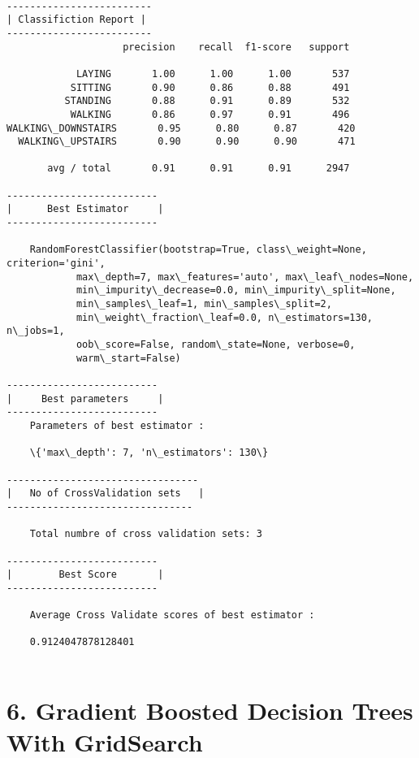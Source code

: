 \documentclass[11pt]{article}
\begin{document}
    \begin{center}
    \end{center}
    { \hspace*{\fill} \\}
    
    \begin{Verbatim}[commandchars=\\\{\}]
-------------------------
| Classifiction Report |
-------------------------
                    precision    recall  f1-score   support

            LAYING       1.00      1.00      1.00       537
           SITTING       0.90      0.86      0.88       491
          STANDING       0.88      0.91      0.89       532
           WALKING       0.86      0.97      0.91       496
WALKING\_DOWNSTAIRS       0.95      0.80      0.87       420
  WALKING\_UPSTAIRS       0.90      0.90      0.90       471

       avg / total       0.91      0.91      0.91      2947

--------------------------
|      Best Estimator     |
--------------------------

	RandomForestClassifier(bootstrap=True, class\_weight=None, criterion='gini',
            max\_depth=7, max\_features='auto', max\_leaf\_nodes=None,
            min\_impurity\_decrease=0.0, min\_impurity\_split=None,
            min\_samples\_leaf=1, min\_samples\_split=2,
            min\_weight\_fraction\_leaf=0.0, n\_estimators=130, n\_jobs=1,
            oob\_score=False, random\_state=None, verbose=0,
            warm\_start=False)

--------------------------
|     Best parameters     |
--------------------------
	Parameters of best estimator : 

	\{'max\_depth': 7, 'n\_estimators': 130\}

---------------------------------
|   No of CrossValidation sets   |
--------------------------------

	Total numbre of cross validation sets: 3

--------------------------
|        Best Score       |
--------------------------

	Average Cross Validate scores of best estimator : 

	0.9124047878128401


    \end{Verbatim}

    \section{6. Gradient Boosted Decision Trees With
GridSearch}\label{gradient-boosted-decision-trees-with-gridsearch}
\end{document}
